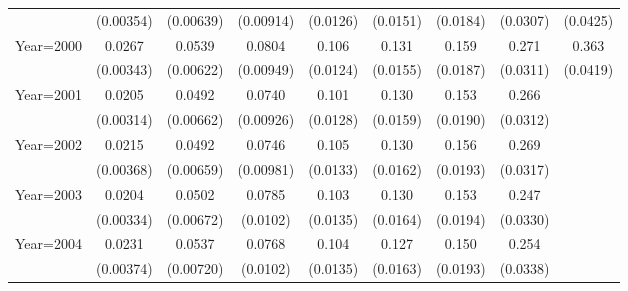 \begin{table}[htbp]
\begin{tabular}{l*{8}{c}}
                    &   (0.00354)         &   (0.00639)         &   (0.00914)         &    (0.0126)         &    (0.0151)         &    (0.0184)         &    (0.0307)         &    (0.0425)         \\
[1em]
Year=2000           &      0.0267\sym{***}&      0.0539\sym{***}&      0.0804\sym{***}&       0.106\sym{***}&       0.131\sym{***}&       0.159\sym{***}&       0.271\sym{***}&       0.363\sym{***}\\
                    &   (0.00343)         &   (0.00622)         &   (0.00949)         &    (0.0124)         &    (0.0155)         &    (0.0187)         &    (0.0311)         &    (0.0419)         \\
[1em]
Year=2001           &      0.0205\sym{***}&      0.0492\sym{***}&      0.0740\sym{***}&       0.101\sym{***}&       0.130\sym{***}&       0.153\sym{***}&       0.266\sym{***}&                     \\
                    &   (0.00314)         &   (0.00662)         &   (0.00926)         &    (0.0128)         &    (0.0159)         &    (0.0190)         &    (0.0312)         &                     \\
[1em]
Year=2002           &      0.0215\sym{***}&      0.0492\sym{***}&      0.0746\sym{***}&       0.105\sym{***}&       0.130\sym{***}&       0.156\sym{***}&       0.269\sym{***}&                     \\
                    &   (0.00368)         &   (0.00659)         &   (0.00981)         &    (0.0133)         &    (0.0162)         &    (0.0193)         &    (0.0317)         &                     \\
[1em]
Year=2003           &      0.0204\sym{***}&      0.0502\sym{***}&      0.0785\sym{***}&       0.103\sym{***}&       0.130\sym{***}&       0.153\sym{***}&       0.247\sym{***}&                     \\
                    &   (0.00334)         &   (0.00672)         &    (0.0102)         &    (0.0135)         &    (0.0164)         &    (0.0194)         &    (0.0330)         &                     \\
[1em]
Year=2004           &      0.0231\sym{***}&      0.0537\sym{***}&      0.0768\sym{***}&       0.104\sym{***}&       0.127\sym{***}&       0.150\sym{***}&       0.254\sym{***}&                     \\
                    &   (0.00374)         &   (0.00720)         &    (0.0102)         &    (0.0135)         &    (0.0163)         &    (0.0193)         &    (0.0338)         &                     \\

\end{tabular}
\end{table}
